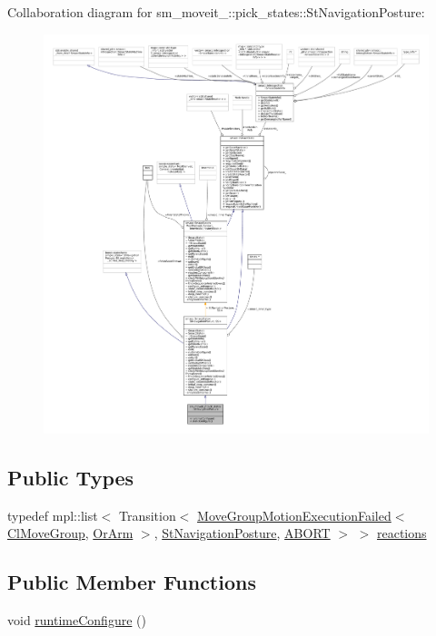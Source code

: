 Collaboration diagram for sm\+\_\+moveit\+\_\+:\+:pick\+\_\+states\+:\+:St\+Navigation\+Posture\+:
\nopagebreak
\begin{figure}[H]
\begin{center}
\leavevmode
\includegraphics[width=350pt]{structsm__moveit__2_1_1pick__states_1_1StNavigationPosture__coll__graph}
\end{center}
\end{figure}
\subsection*{Public Types}
\begin{DoxyCompactItemize}
\item 
typedef mpl\+::list$<$ Transition$<$ \hyperlink{structmoveit__z__client_1_1MoveGroupMotionExecutionFailed}{Move\+Group\+Motion\+Execution\+Failed}$<$ \hyperlink{classmoveit__z__client_1_1ClMoveGroup}{Cl\+Move\+Group}, \hyperlink{classsm__moveit__2_1_1OrArm}{Or\+Arm} $>$, \hyperlink{structsm__moveit__2_1_1pick__states_1_1StNavigationPosture}{St\+Navigation\+Posture}, \hyperlink{classABORT}{A\+B\+O\+RT} $>$ $>$ \hyperlink{structsm__moveit__2_1_1pick__states_1_1StNavigationPosture_a164a8597cb60179080a418f6e48aa0c7}{reactions}
\end{DoxyCompactItemize}
\subsection*{Public Member Functions}
\begin{DoxyCompactItemize}
\item 
void \hyperlink{structsm__moveit__2_1_1pick__states_1_1StNavigationPosture_a0cec0d8766ab498b7a1f588c79e09e7a}{runtime\+Configure} ()
\end{DoxyCompactItemize}
